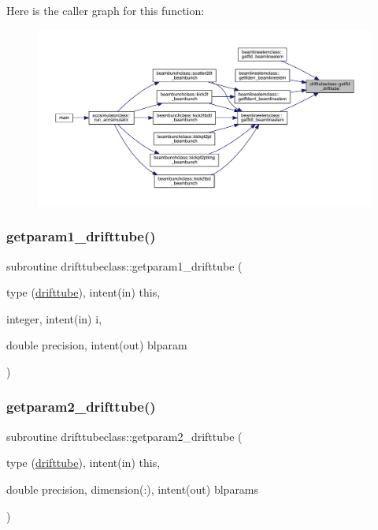 Here is the caller graph for this function\+:\nopagebreak
\begin{figure}[H]
\begin{center}
\leavevmode
\includegraphics[width=350pt]{namespacedrifttubeclass_aa903101ae6943402917a2f29a8aa67d3_icgraph}
\end{center}
\end{figure}
\mbox{\label{namespacedrifttubeclass_ade5fb645fa735d4743cd431024727261}} 
\subsubsection{\texorpdfstring{getparam1\_drifttube()}{getparam1\_drifttube()}}
{\footnotesize\ttfamily subroutine drifttubeclass\+::getparam1\+\_\+drifttube (\begin{DoxyParamCaption}\item[{type (\mbox{\hyperlink{namespacedrifttubeclass_structdrifttubeclass_1_1drifttube}{drifttube}}), intent(in)}]{this,  }\item[{integer, intent(in)}]{i,  }\item[{double precision, intent(out)}]{blparam }\end{DoxyParamCaption})}

\mbox{\label{namespacedrifttubeclass_af16030dcb46192b3748c28ceb1ca7d4f}} 
\subsubsection{\texorpdfstring{getparam2\_drifttube()}{getparam2\_drifttube()}}
{\footnotesize\ttfamily subroutine drifttubeclass\+::getparam2\+\_\+drifttube (\begin{DoxyParamCaption}\item[{type (\mbox{\hyperlink{namespacedrifttubeclass_structdrifttubeclass_1_1drifttube}{drifttube}}), intent(in)}]{this,  }\item[{double precision, dimension(\+:), intent(out)}]{blparams }\end{DoxyParamCaption})}


